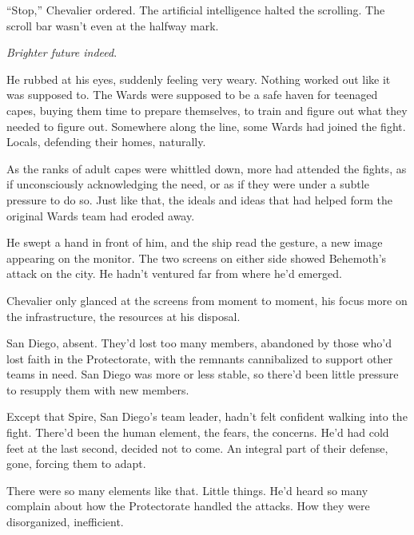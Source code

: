 ``Stop,'' Chevalier ordered.  The artificial intelligence halted the scrolling.  The scroll bar wasn't even at the halfway mark.



\emph{Brighter future indeed}.



He rubbed at his eyes, suddenly feeling very weary.  Nothing worked out like it was supposed to.  The Wards were supposed to be a safe haven for teenaged capes, buying them time to prepare themselves, to train and figure out what they needed to figure out.  Somewhere along the line, some Wards had joined the fight.  Locals, defending their homes, naturally.



As the ranks of adult capes were whittled down, more had attended the fights, as if unconsciously acknowledging the need, or as if they were under a subtle pressure to do so.  Just like that, the ideals and ideas that had helped form the original Wards team had eroded away.



He swept a hand in front of him, and the ship read the gesture, a new image appearing on the monitor.  The two screens on either side showed Behemoth's attack on the city.  He hadn't ventured far from where he'd emerged.



Chevalier only glanced at the screens from moment to moment, his focus more on the infrastructure, the resources at his disposal.



San Diego, absent.  They'd lost too many members, abandoned by those who'd lost faith in the Protectorate, with the remnants cannibalized to support other teams in need.  San Diego was more or less stable, so there'd been little pressure to resupply them with new members.



Except that Spire, San Diego's team leader, hadn't felt confident walking into the fight.  There'd been the human element, the fears, the concerns.  He'd had cold feet at the last second, decided not to come.  An integral part of their defense, gone, forcing them to adapt.



There were so many elements like that.  Little things.  He'd heard so many complain about how the Protectorate handled the attacks.  How they were disorganized, inefficient.



